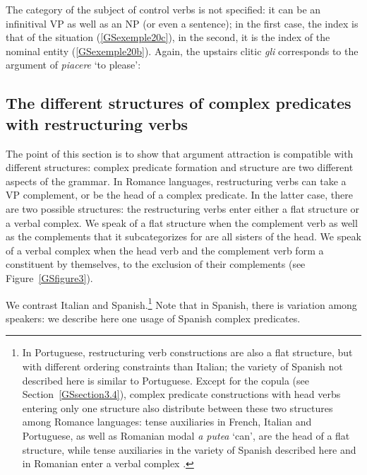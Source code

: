 {The category of the subject of control verbs is not specified: it can be an infinitival VP as well as an NP (or even a sentence); in the first case, the index is that of the situation (\ref{GSexemple20c}), in the second, it is the index of the nominal entity (\ref{GSexemple20b}). Again, the upstairs clitic \emph{gli} corresponds to the argument of \emph{piacere} `to please':

\eal
\judgewidth{\%}
	\label{GSexemple20}
    \label{GSexemple20a}

	\label{GSexemple20b}		
		
	\label{GSexemple20c}	
\zl

\subsection{The different structures of complex predicates with restructuring verbs} \label{GSsection3.2}

The point of this section is to show that argument attraction is compatible with different structures: complex predicate formation and structure are two different aspects of the grammar. In Romance languages, restructuring verbs can take a VP complement, or be the head of a complex predicate. In the latter case, there are two possible structures: the restructuring verbs enter either a flat structure or a verbal complex. We speak of a flat structure when the complement verb as well as the complements that it subcategorizes for are all sisters of the head. We speak of a verbal complex when the head verb and the complement verb form a constituent by themselves, to the exclusion of their complements (see Figure~\ref{GSfigure3}).

We contrast Italian and Spanish.\footnote{In Portuguese, restructuring verb constructions are also a flat structure, but with different ordering constraints than Italian; the variety of Spanish not described here is similar to Portuguese. Except for the copula (see Section~\ref{GSsection3.4}), complex predicate constructions with head verbs entering only one structure also distribute between these two structures among Romance languages: tense auxiliaries in French, Italian and Portuguese, as well as Romanian modal \emph{a putea} `can', are the head of a flat structure, while tense auxiliaries in the variety of Spanish described here and in Romanian enter a verbal complex \citep{AG2010}.} Note that in Spanish, there is variation among speakers: we describe here one usage of Spanish complex predicates. 

}
